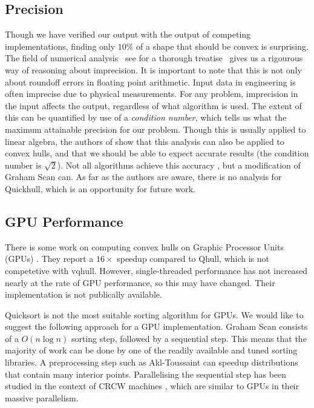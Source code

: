 \subsection{Precision}

Though we have verified our output with the output of competing implementations,
finding only $10\%$ of a shape that should be convex is surprising. The field
of numerical analysis 
\textemdash{}~see \cite{Higham02} for a thorough treatise~\textemdash{} gives
us a rigourous way of reasoning about imprecision. It is important to note that
this is not only about roundoff errors in floating point arithmetic. Input data
in engineering is often imprecise due to physical measurements. 
For any problem, imprecision in the input affects the output, regardless of what
algorithm is used. The extent of this can be quantified by use of a
\textit{condition number}, which tells us what the maximum attainable precision
for our problem.
Though this is usually applied to linear algebra, the authors of
\cite{Jiang06} show that this analysis can also be applied to convex hulls,
and that we should be able to expect accurate results (the condition number
is $\sqrt{2}$). Not all algorithms achieve this accuracy \cite{Kettner08},
but a modification of Graham Scan \cite{Fortune89} can.
As far as the authors are aware, there is no analysis for Quickhull,
which is an opportunity for future work.

\subsection{GPU Performance}

There is some work on computing convex hulls on Graphic Processor Units (GPUs)
\cite{Srungarapu11}. They report a $16\times$ speedup compared to Qhull, which
is not competetive with vqhull. However, single-threaded performance has not
increased nearly at the rate of GPU performance, so this may have changed. Their
implementation is not publically available.

Quicksort is not the most suitable sorting algorithm for GPUs. We would like
to suggest the following approach for a GPU implementation. Graham Scan consists
of a $O(n \log n)$ sorting step, followed by a sequential step. This means that
the majority of work can be done by one of the readily available and tuned
sorting libraries. A preprocessing step such as Akl-Toussaint can speedup 
distributions that contain many interior points. Parallelising the sequential
step has been studied in the context of CRCW machines \cite{Goodrich87},
which are similar to GPUs in their massive parallelism.
